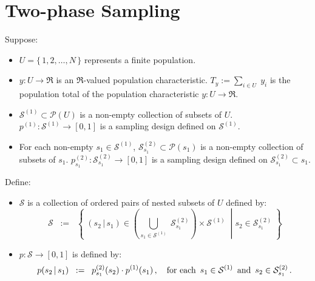 

\section{Two-phase Sampling}
\setcounter{theorem}{0}
\setcounter{equation}{0}



\begin{theorem}
\mbox{}\vskip 0.1cm
\noindent
Suppose:
\begin{itemize}
\item
	$U = \{\,1,2,\ldots,N\,\}$ represents a finite population.
\item
	$y : U \longrightarrow \Re$ is an $\Re$-valued population characteristic.
	\vskip 0.1cm
	$T_{y} := \underset{i \in U}{\sum}\;y_{i}$ is the population total of the population characteristic $y : U \longrightarrow \Re$.
\item
	$\mathcal{S}^{(1)} \subset \mathcal{P}(U)$ is a non-empty collection of subsets of $U$.
	\vskip 0.1cm
	$p^{(1)} : \mathcal{S}^{(1)} \longrightarrow [0,1]$ is a sampling design defined on $\mathcal{S}^{(1)}$.
\item
	For each non-empty $s_{1} \in \mathcal{S}^{(1)}$,
	$\mathcal{S}^{(2)}_{s_{1}} \subset \mathcal{P}(s_{1})$ is a non-empty collection of subsets of $s_{1}$.
	\vskip 0.1cm
	$p^{(2)}_{s_{1}} : \mathcal{S}^{(2)}_{s_{1}} \longrightarrow [0,1]$ is a sampling design defined on $\mathcal{S}^{(2)}_{s_{1}} \subset s_{1}$.
\end{itemize}
Define:
\begin{itemize}
\item
	$\mathcal{S}$ is a collection of ordered pairs of nested subsets of $U$ defined by:
	\begin{equation*}
	\mathcal{S}
	\;\; := \;\;
		\left\{\;
		\left.
			(s_{2}\,\vert\,s_{1}) \in \left(\underset{s_{1}\in\mathcal{S}^{(1)}}{\bigcup}\; \mathcal{S}^{(2)}_{s_{1}}\right) \times \mathcal{S}^{(1)}
		\;\;\right\vert\;
			s_{2} \in \mathcal{S}^{(2)}_{s_{1}}
		\;\right\}
	\end{equation*}
\item
	$p : \mathcal{S} \longrightarrow [0,1]$ is defined by:
	\begin{equation*}
	p(s_{2}\,\vert\,s_{1}) \;\; := \;\; p^{(2)}_{s_{1}}(s_{2}) \cdot p^{(1)}(s_{1})\,,
	\quad
	\textnormal{for each \,$s_{1} \in \mathcal{S}^{(1)}$\, and \,$s_{2} \in \mathcal{S}^{(2)}_{s_{1}}$}\,.
	\end{equation*}

\end{itemize}
\end{theorem}

